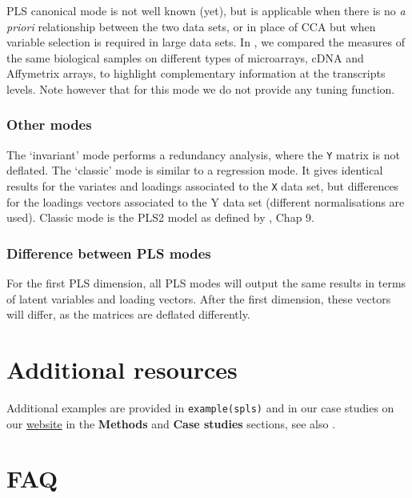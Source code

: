 \documentclass[]{book}
\theoremstyle{definition}
\theoremstyle{definition}
\theoremstyle{definition}
\theoremstyle{remark}
\begin{document}
PLS canonical mode is not well known (yet), but is applicable when there
is no \emph{a priori} relationship between the two data sets, or in
place of CCA but when variable selection is required in large data sets.
In \citep{Lec09a}, we compared the measures of the same biological
samples on different types of microarrays, cDNA and Affymetrix arrays,
to highlight complementary information at the transcripts levels. Note
however that for this mode we do not provide any tuning function.

\subsubsection{Other modes}\label{other-modes}

The `invariant' mode performs a redundancy analysis, where the
\texttt{Y} matrix is not deflated. The `classic' mode is similar to a
regression mode. It gives identical results for the variates and
loadings associated to the \texttt{X} data set, but differences for the
loadings vectors associated to the Y data set (different normalisations
are used). Classic mode is the PLS2 model as defined by \citep{Ten98},
Chap 9.

\subsubsection{Difference between PLS
modes}\label{difference-between-pls-modes}

For the first PLS dimension, all PLS modes will output the same results
in terms of latent variables and loading vectors. After the first
dimension, these vectors will differ, as the matrices are deflated
differently.

\section{Additional resources}\label{additional-resources-2}

Additional examples are provided in \texttt{example(spls)} and in our
case studies on our \href{http://www.mixomics.org}{website} in the
\textbf{Methods} and \textbf{Case studies} sections, see also
\citep{Lec08, Lec09a}.

\section{FAQ}\label{faq-2}
\end{document}
